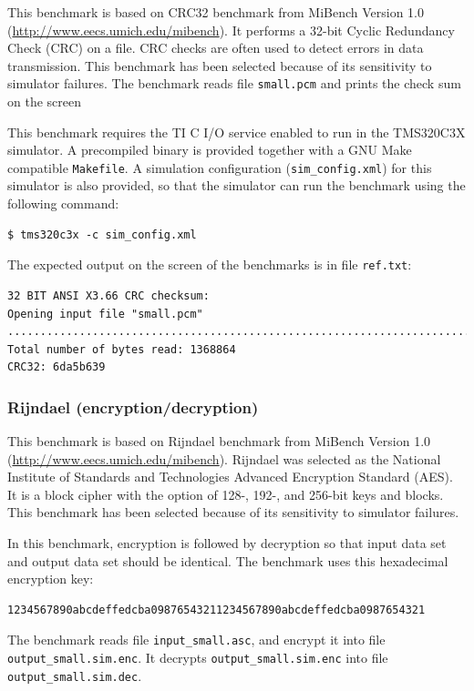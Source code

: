 This benchmark is based on CRC32 benchmark from MiBench Version 1.0 (\url{http://www.eecs.umich.edu/mibench}).
It performs a 32-bit Cyclic Redundancy Check (CRC) on a file. 
CRC checks are often used to detect errors in data transmission.
This benchmark has been selected because of its sensitivity to simulator failures.
The benchmark reads file \texttt{small.pcm} and prints the check sum on the screen

This benchmark requires the TI C I/O service enabled to run in the TMS320C3X simulator.
A precompiled binary is provided together with a GNU Make compatible \texttt{Makefile}.
A simulation configuration (\texttt{sim\_config.xml}) for this simulator is also provided, so that the simulator can run the benchmark using the following command:

\begin{verbatim}
$ tms320c3x -c sim_config.xml
\end{verbatim}

\noindent The expected output on the screen of the benchmarks is in file \texttt{ref.txt}:

\begin{verbatim}
32 BIT ANSI X3.66 CRC checksum:
Opening input file "small.pcm"
....................................................................................
Total number of bytes read: 1368864
CRC32: 6da5b639
\end{verbatim}

\subsubsection{Rijndael (encryption/decryption)}

This benchmark is based on Rijndael benchmark from MiBench Version 1.0 (\url{http://www.eecs.umich.edu/mibench}).
Rijndael was selected as the National Institute of Standards and Technologies Advanced Encryption Standard (AES).
It is a block cipher with the option of 128-, 192-, and 256-bit keys and blocks.
This benchmark has been selected because of its sensitivity to simulator failures.

In this benchmark, encryption is followed by decryption so that input data set and output data set should be identical.
The benchmark uses this hexadecimal encryption key:
\begin{verbatim}
1234567890abcdeffedcba09876543211234567890abcdeffedcba0987654321
\end{verbatim}
The benchmark reads file \texttt{input\_small.asc}, and encrypt it into file \texttt{output\_small.sim.enc}.
It decrypts \texttt{output\_small.sim.enc} into file \texttt{output\_small.sim.dec}.

